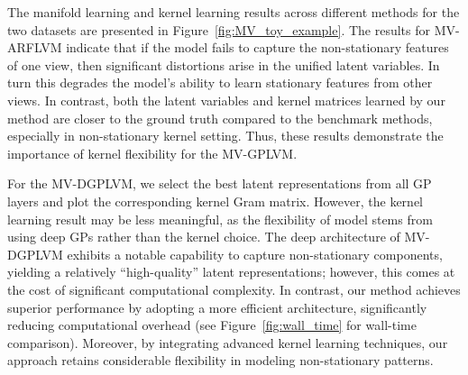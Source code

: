 The manifold learning and kernel learning results across different methods for the two datasets are presented in Figure~\ref{fig:MV_toy_example}. The results for \MakeUppercase{mv-arflvm} indicate that if the model fails to capture the non-stationary features of one view, then significant distortions arise in the unified latent variables. In turn this degrades the model’s ability to learn stationary features from other views. %
In contrast, %
both the latent variables and kernel matrices learned by our method are closer to the ground truth compared to the benchmark methods, especially in non-stationary kernel setting. Thus, these results demonstrate the importance of kernel flexibility for the MV-GPLVM. %

For the MV-DGPLVM, we select the best latent representations from all \MakeUppercase{gp} layers and plot the corresponding kernel Gram matrix. However, the kernel learning result may be less meaningful, as the flexibility of model stems from using deep GPs rather than the kernel choice. The deep architecture of MV-DGPLVM exhibits a notable capability to capture non-stationary components, yielding a relatively ``high-quality'' latent representations; however, this comes at the cost of significant computational complexity. In contrast, our method achieves superior performance by adopting a more efficient architecture, significantly reducing computational overhead (see Figure~\ref{fig:wall_time} for wall-time comparison). Moreover, by integrating advanced kernel learning techniques, our approach retains considerable flexibility in modeling non-stationary patterns.

